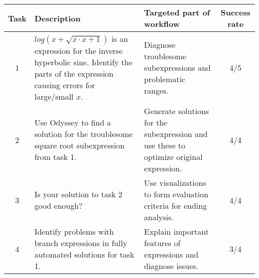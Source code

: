 \begin{tabular}{|c|p{5cm}|p{6cm}|c|}
  \hline
      Task & Description & Targeted part of workflow & Success rate \\
  \hline
  1 & $log(x + \sqrt{x \cdot x + 1})$ is an expression for the inverse hyperbolic 
  sine. Identify the parts of the expression causing errors for large/small $x$. & Diagnose troublesome 
  subexpressions and problematic ranges. & 4/5 \\
  \hline
  2 & Use Odyssey to find a solution for the troublesome square root subexpression from task 1. 
  & Generate solutions for the subexpression and use these to optimize original expression.
  & 4/4 \\
  \hline
  3 & Is your solution to task 2 good enough? 
  & Use visualizations to form evaluation criteria for ending analysis.
  & 4/4 \\
  \hline
  4 & Identify problems with branch expressions in fully automated solutions for task 1.
  & Explain important features of expressions and diagnose issues. & 3/4\\

\end{tabular}
